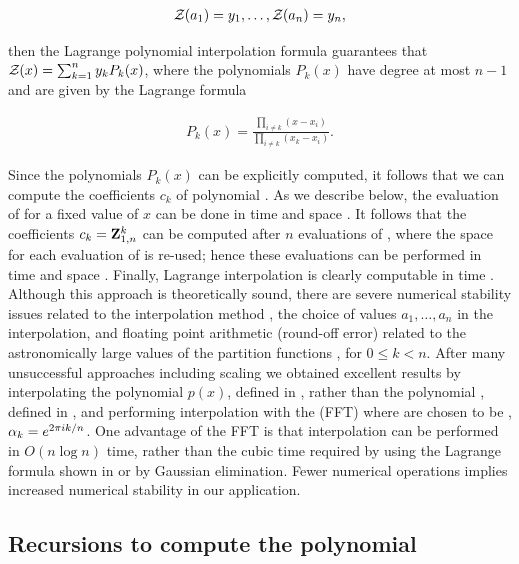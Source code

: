 \begin{align}
\label{eq:fftbor:solutionsForAlpha}
\emZof{}{a_1} = y_1, \dots, \emZof{}{a_n} = y_n,
\end{align}

then the Lagrange polynomial interpolation formula guarantees that
${\mathcal Z}_{}(x) = \sum_{k=1}^n y_k P_k(x)$, where the polynomials $P_k(x)$ have degree
at most $n-1$ and are given by the Lagrange formula

\begin{align}
\label{eq:fftbor:lagrangeInterpolation}
P_k(x) = \frac{\prod_{i\ne k} (x-x_i)}{\prod_{i \ne k} (x_k-x_i)}.
\end{align}

Since the polynomials $P_k(x)$ can be explicitly computed, it follows that
we can compute the coefficients $c_k$ of polynomial \fullZx. As we describe
below, the evaluation of \fullZx for a fixed value of $x$ can be done in
time  and space .  It follows that the coefficients
$c_k={\bf Z}^{k}_{1,n}$ can be computed after
$n$ evaluations of \fullZx, where the space for each evaluation of \fullZx
is re-used; hence these evaluations can be performed in time  and space
. Finally,
Lagrange interpolation is clearly computable in time .
Although this approach is theoretically sound, there are severe
numerical stability issues related to the interpolation method
\citep{highambarycentricinterpolation},
the choice of values $a_1,\dots,a_{n}$ in the interpolation,
and floating point arithmetic (round-off error) related to the
astronomically large values of the partition functions
, for $0 \leq k < n$. After many unsuccessful
approaches including scaling we obtained excellent results by
interpolating the polynomial $p(x)$, defined in ,
rather than the polynomial \fullZx, defined in ,
and performing interpolation with the \fft (FFT) \citep{cormen}
where \alphaN are
chosen to be \nRoUs,
$\alpha_k = e^{2 \pi i k/n}$.
One
advantage of the FFT is that interpolation can be performed in $O(n \log n)$
time, rather than the cubic time required by using the Lagrange formula
shown in  or by Gaussian elimination. Fewer
numerical operations implies increased numerical stability in our application.

\subsection{Recursions to compute the polynomial
\texorpdfstring{}{}}
\label{subsec:fftbor:polynomial}

